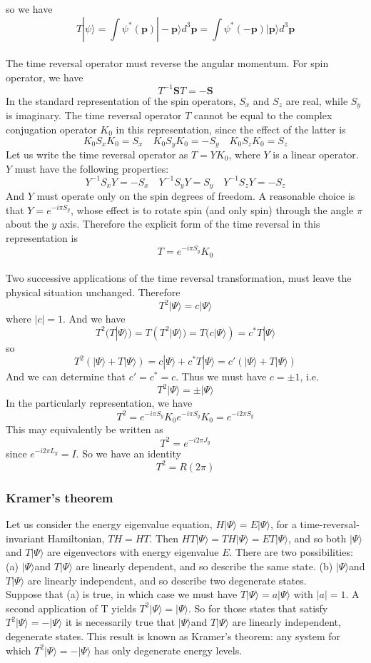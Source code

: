 \documentclass[cyan]{elegantnote}
\begin{document}
so we have
\[T|\psi\rangle = \int \psi^*(\bm{p})|-\bm{p}\rangle d^3 \bm{p} = \int \psi^*(\bm{-p})|\bm{p}\rangle d^3 \bm{p}\]\\ 
The time reversal operator must reverse the angular momentum. For spin operator, we have
\[T^{-1}\bm{S}T = -\bm{S}\]
In the standard representation of the spin operators, $S_x$ and $S_z$ are real, while $S_y$ is imaginary. The time reversal operator $T$ cannot be equal to the complex conjugation operator $K_0$ in this representation, since the effect of the latter is
\[K_0S_xK_0 = S_x \quad K_0S_yK_0 = -S_y \quad K_0S_zK_0 = S_z\]
Let us write the time reversal operator as $T=YK_0$, where $Y$ is a linear operator. $Y$ must have the following properties:
\[Y^{-1}S_xY = -S_x \quad Y^{-1}S_yY = S_y \quad Y^{-1}S_zY = -S_z\]
And $Y$ must operate only on the spin degrees of freedom. A reasonable choice is that $Y = e^{-i\pi S_y}$, whose effect is
to rotate spin (and only spin) through the angle $\pi$ about the $y$ axis. Therefore the explicit form of the time reversal in this representation is
\[T = e^{-i\pi S_y}K_0\]\\
Two successive applications of the time reversal transformation, must leave the physical situation unchanged. Therefore
\[T^2|\Psi\rangle = c|\Psi\rangle\]
where $|c|=1$. And we have
\[T^2(T|\Psi\rangle) = T(T^2|\Psi\rangle) = T(c|\Psi\rangle) = c^* T|\Psi\rangle\]
so 
\[T^2(|\Psi\rangle + T|\Psi\rangle) = c|\Psi\rangle + c^* T|\Psi\rangle = c'(|\Psi\rangle + T|\Psi\rangle)\]
And we can determine that $c' = c^* = c$. Thus we must have $c = \pm 1$, i.e.
\[T^2|\Psi\rangle = \pm |\Psi\rangle\]
In the particularly representation, we have
\[T^2 = e^{-i\pi S_y}K_0 e^{-i\pi S_y}K_0 = e^{-i2\pi S_y}\]
This may equivalently be written as
\[T^2 = e^{-i2\pi J_y}\]
since $e^{-i2\pi L_y} = I$. So we have an identity
\[T^2 = R(2\pi)\]

\subsubsection{Kramer's theorem}
Let us consider the energy eigenvalue equation, $H|\Psi\rangle = E|\Psi\rangle$, for a time-reversal-invariant Hamiltonian, $TH=HT$. 
Then $HT|\Psi\rangle =  TH|\Psi\rangle = ET|\Psi\rangle$, and so
both $|\Psi\rangle$ and $T|\Psi\rangle$ are eigenvectors with energy eigenvalue $E$. 
There are two possibilities: 
(a) $|\Psi\rangle$and $T|\Psi\rangle$ are linearly dependent, and so describe the same state.
(b) $|\Psi\rangle$and $T|\Psi\rangle$ are linearly independent,
and so describe two degenerate states.\\
Suppose that (a) is true, in which case we must have $T|\Psi\rangle = a|\Psi\rangle$ with $|a|=1$. A second application of T yields $T^2|\Psi\rangle = |\Psi\rangle$. 
So for those states that satisfy $T^2|\Psi\rangle = -|\Psi\rangle$ it is necessarily true that $|\Psi\rangle$and $T|\Psi\rangle$ are linearly independent, degenerate states. This result is known as Kramer's theorem: any
system for which $T^2|\Psi\rangle = -|\Psi\rangle$ has only degenerate energy levels.
\end{document}

